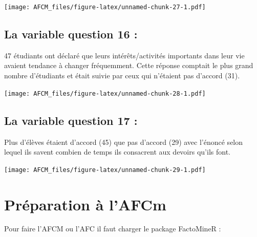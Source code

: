 \documentclass[
]{article}
\newenvironment{Shaded}{\begin{snugshade}}{\end{snugshade}}
\newcommand{\FunctionTok}[1]{\textcolor[rgb]{0.00,0.00,0.00}{#1}}
\newcommand{\NormalTok}[1]{#1}
\newcommand{\SpecialCharTok}[1]{\textcolor[rgb]{0.00,0.00,0.00}{#1}}
\newcommand{\StringTok}[1]{\textcolor[rgb]{0.31,0.60,0.02}{#1}}
\begin{document}
\texttt{[image: AFCM\_files/figure-latex/unnamed-chunk-27-1.pdf]}

\hypertarget{la-variable-question-16}{%
\subsection{La variable question 16 :}\label{la-variable-question-16}}

47 étudiants ont déclaré que leurs intérêts/activités importants dans
leur vie avaient tendance à changer fréquemment. Cette réponse comptait
le plus grand nombre d'étudiants et était suivie par ceux qui n'étaient
pas d'accord (31).

\begin{Shaded}
\end{Shaded}

\texttt{[image: AFCM\_files/figure-latex/unnamed-chunk-28-1.pdf]}

\hypertarget{la-variable-question-17}{%
\subsection{La variable question 17 :}\label{la-variable-question-17}}

Plus d'élèves étaient d'accord (45) que pas d'accord (29) avec l'énoncé
selon lequel ils savent combien de temps ils consacrent aux devoirs
qu'ils font.

\begin{Shaded}
\end{Shaded}

\texttt{[image: AFCM\_files/figure-latex/unnamed-chunk-29-1.pdf]}

\hypertarget{pruxe9paration-uxe0-lafcm}{%
\section{Préparation à l'AFCm}\label{pruxe9paration-uxe0-lafcm}}

Pour faire l'AFCM ou l'AFC il faut charger le package FactoMineR :
\end{document}
